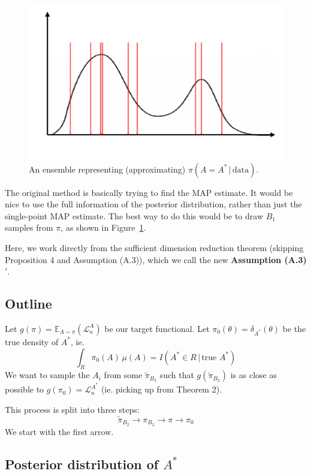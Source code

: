 \documentclass[ejs,preprint]{imsart}
\newcommand\E{\mathbb{E}}
\newcommand\risk{\mathcal{L}}
\begin{document}
\begin{figure}
\begin{centering}
\includegraphics[scale=0.4]{illustration2}
\par\end{centering}
\caption{An ensemble representing (approximating) $\pi(A=A^*\,|\,\mathrm{data})$.}
\label{fig:illust2}
\end{figure}

The original method is basically trying to find the MAP estimate. It would be nice to use the full information of the posterior distribution, rather than just the single-point MAP estimate. The best way to do this would be to draw $B_1$ samples from $\pi$, as shown in Figure~\ref{fig:illust2}.

Here, we work directly from the sufficient dimension reduction theorem (skipping Proposition 4 and Assumption (A.3)), which we call the new \textbf{Assumption (A.3)$'$}.

\subsection{Outline}

Let $g(\pi)=\E_{A\sim\pi}(\risk_n^A)$ be our target functional. Let $\pi_0(\theta)=\delta_{A^*}(\theta)$ be the true density of $A^*$, ie.
\[
\int_R\!\pi_0(A)\,\mu(A)=I(A^*\in R\,|\,\text{true }A^*)
\]
We want to sample the $A_i$ from some $\tilde \pi_{B_2}$ such that $g(\tilde \pi_{B_2})$ is as close as possible to $g(\pi_0)=\risk_n^{A^*}$ (ie. picking up from Theorem 2).

This process is split into three steps:
\[
\tilde\pi_{B_2} \to \pi_{B_2} \to \pi \to \pi_0
\]
We start with the first arrow.

\subsection{Posterior distribution of $A^*$}
\end{document}
